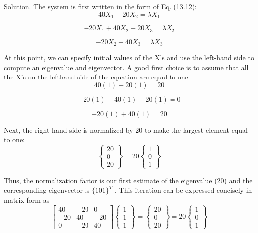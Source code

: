 \documentclass[../main.tex]{subfiles}
\begin{document}
Solution. The system is first written in the form of Eq. (13.12):
\begin{equation}
40X_{1}-20X_{2}=\lambda X_{1}
\end{equation}

\begin{equation}
-20X_{1}+40X_{2}-20X_{3}=\lambda X_{2}
\end{equation}

\begin{equation}
-20X_{2}+40X_{3}=\lambda X_{3}
\end{equation}

At this point, we can specify initial values of the X's and use the left-hand side to compute
an eigenvalue and eigenvector. A good first choice is to assume that all the X's on the lefthand side of the equation are equal to one
\begin{equation}
40(1) - 20(1) = 20
\end{equation}

\begin{equation}
-20(1) + 40(1) - 20(1) = 0
\end{equation}

\begin{equation}
- 20(1) + 40(1) = 20
\end{equation}

Next, the right-hand side is normalized by 20 to make the largest element equal to one:
\begin{equation}
\begin{Bmatrix}
20\\
0\\
20
\end{Bmatrix}
= 20\begin{Bmatrix}
1\\
0\\
1
\end{Bmatrix}
\end{equation}

Thus, the normalization factor is our first estimate of the eigenvalue (20) and the corresponding eigenvector is $\{1 0 1\}^{T}$
. This iteration can be expressed concisely in matrix form as
\begin{equation}
\begin{bmatrix}
40 & -20 &0 \\
-20 & 40 & -20\\
0 & -20 & 40
\end{bmatrix}
\begin{Bmatrix}
1\\
1\\
1
\end{Bmatrix}
=\begin{Bmatrix}
20\\
0\\
20
\end{Bmatrix}
=20\begin{Bmatrix}
1\\
0\\
1
\end{Bmatrix}
\end{equation}
\end{document}
